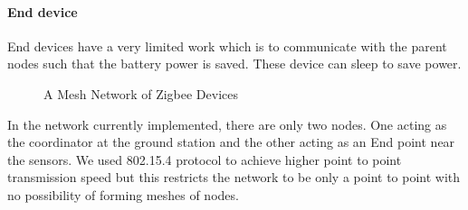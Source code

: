 	   \paragraph{End device}
	   End devices have a very limited work which is to communicate with the parent nodes such that the battery power is saved. These device can sleep to save power.\\
	   \newline
	   \newline
\begin{figure}[H]
  \centering
  \noindent{}
  \caption{A Mesh Network of Zigbee Devices}
  \label{fig:quadrotor_trajectory}
\end{figure}	   
	   
	   In the network currently implemented, there are only two nodes. One acting as the coordinator at the ground station and the other acting as an End point near the sensors. We used 802.15.4 protocol to achieve higher point to point transmission speed but this restricts the network to be only a point to point with no possibility of forming meshes of nodes. 

	   
	   